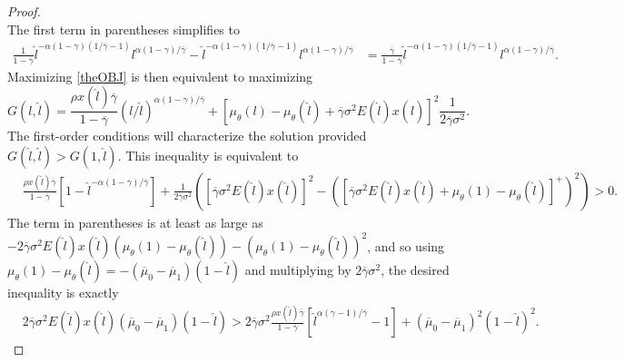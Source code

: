 \documentclass[11pt]{article}
\theoremstyle{plain}
\begin{document}
\begin{proof}
\begin{equation}
\label{theOBJ}
\end{equation}
The first term in parentheses simplifies to 
\begin{align*}
\frac{1}{1-\overline{\gamma}}\hat{l}^{-\alpha(1-\gamma)(1/\overline{\gamma}-1)} l^{\alpha(1-\gamma)/\overline{\gamma}}
  - \hat{l}^{-\alpha(1-\gamma)(1/\overline{\gamma}-1)}l^{\alpha(1-\gamma)/\overline{\gamma}}
& = \frac{\overline{\gamma}}{1-\overline{\gamma}}\hat{l}^{-\alpha(1-\gamma)(1/\overline{\gamma}-1)}l^{\alpha(1-\gamma)/\overline{\gamma}}.
\end{align*}
Maximizing \eqref{theOBJ} is then equivalent to maximizing
\begin{equation}
G(l,\hat{l}) = \frac{\rho x(\hat{l})\overline{\gamma}}{1-\overline{\gamma}}(l/\hat{l})^{\alpha(1-\gamma)/\overline{\gamma}}
 + {\left[\mu_{\theta}(l) - \mu_{\theta}(\hat{l}) +  \overline{\gamma}\sigma^2 E(\hat{l}) x(\hat{l})\right]}^2 \frac{1}{2\overline{\gamma}\sigma^2}.
 \label{reall}
\end{equation}
The first-order conditions will characterize the solution provided $G(\hat{l},\hat{l}) > G(1,\hat{l})$. This inequality is equivalent to
\begin{equation}
\begin{aligned}
& \frac{\rho x(\hat{l})\overline{\gamma}}{1-\overline{\gamma}}[1 - \hat{l}^{-\alpha(1-\gamma)/\overline{\gamma}} ] + \frac{1}{2\overline{\gamma}\sigma^2}
 {\left({\left[\overline{\gamma}\sigma^2E(\hat{l})x(\hat{l})\right]}^2 - {\left({\left[\overline{\gamma}\sigma^2E(\hat{l})x(\hat{l}) + \mu_{\theta}(1) - \mu_{\theta}(\hat{l})\right]}^+\right)}^2\right)} > 0.
\end{aligned}
\label{wantHIGH2}
\end{equation}
The term in parentheses is at least as large as $-2\overline{\gamma}\sigma^2E(\hat{l})x(\hat{l})(\mu_{\theta}(1) - \mu_{\theta}(\hat{l})) - (\mu_{\theta}(1) - \mu_{\theta}(\hat{l}))^2$, and so using $\mu_{\theta}(1) - \mu_{\theta}(\hat{l}) = - (\overline{\mu}_0- \overline{\mu}_1)(1-\hat{l})$ and multiplying by $2\overline{\gamma}\sigma^2$, the desired inequality is exactly
\begin{equation}
\begin{aligned}
& 2\overline{\gamma}\sigma^2E(\hat{l})x(\hat{l})(\overline{\mu}_0- \overline{\mu}_1)(1-\hat{l})  > 2\overline{\gamma}\sigma^2 \frac{\rho x(\hat{l})\overline{\gamma}}{1-\overline{\gamma}}[\hat{l}^{\alpha(\gamma-1)/\overline{\gamma}}-1] + (\overline{\mu}_0- \overline{\mu}_1)^2(1-\hat{l})^2.
\end{aligned}

\end{equation}
\end{proof}
\end{document}
